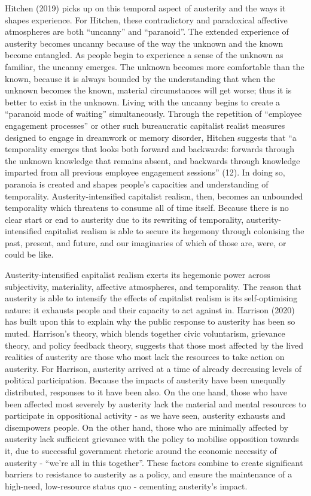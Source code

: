 Hitchen (2019) picks up on this temporal aspect of austerity and the
ways it shapes experience. For Hitchen, these contradictory and
paradoxical affective atmospheres are both ``uncanny'' and ``paranoid''.
The extended experience of austerity becomes uncanny because of the way
the unknown and the known become entangled. As people begin to
experience a sense of the unknown as familiar, the uncanny emerges. The
unknown becomes more comfortable than the known, because it is always
bounded by the understanding that when the unknown becomes the known,
material circumstances will get worse; thus it is better to exist in the
unknown. Living with the uncanny begins to create a ``paranoid mode of
waiting'' simultaneously. Through the repetition of ``employee
engagement processes'' or other such bureaucratic capitalist realist
measures designed to engage in dreamwork or memory disorder, Hitchen
suggests that ``a temporality emerges that looks both forward and
backwards: forwards through the unknown knowledge that remains absent,
and backwards through knowledge imparted from all previous employee
engagement sessions'' (12). In doing so, paranoia is created and shapes
people's capacities and understanding of temporality.
Austerity-intensified capitalist realism, then, becomes an unbounded
temporality which threatens to consume all of time itself. Because there
is no clear start or end to austerity due to its rewriting of
temporality, austerity-intensified capitalist realism is able to secure
its hegemony through colonising the past, present, and future, and our
imaginaries of which of those are, were, or could be like.

Austerity-intensified capitalist realism exerts its hegemonic power
across subjectivity, materiality, affective atmospheres, and
temporality. The reason that austerity is able to intensify the effects
of capitalist realism is its self-optimising nature: it exhausts people
and their capacity to act against in. \citep{harrison_cant_2020} Harrison (2020) has built upon
this to explain why the public response to austerity has been so muted.
Harrison's theory, which blends together civic voluntarism, grievance
theory, and policy feedback theory, suggests that those most affected by
the lived realities of austerity are those who most lack the resources
to take action on austerity. For Harrison, austerity arrived at a time
of already decreasing levels of political participation. Because the
impacts of austerity have been unequally distributed, responses to it
have been also. On the one hand, those who have been affected most
severely by austerity lack the material and mental resources to
participate in oppositional activity - as we have seen, austerity
exhausts and disempowers people. On the other hand, those who are
minimally affected by austerity lack sufficient grievance with the
policy to mobilise opposition towards it, due to successful government
rhetoric around the economic necessity of austerity - ``we're all in
this together''. These factors combine to create significant barriers to
resistance to austerity as a policy, and ensure the maintenance of a
high-need, low-resource status quo - cementing austerity's impact.

